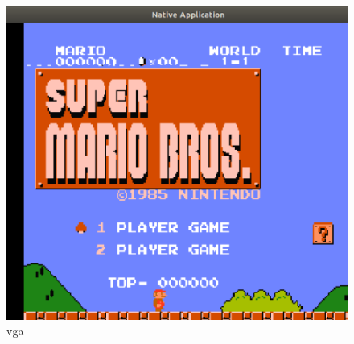 \documentclass[UTF8,a4paper,10pt]{ctexart}
\begin{document}
{\begin{figure}[H]
        \includegraphics[scale=0.25]{fig/22.png}
        \caption{vga}
    \end{figure}
}
\end{document}
